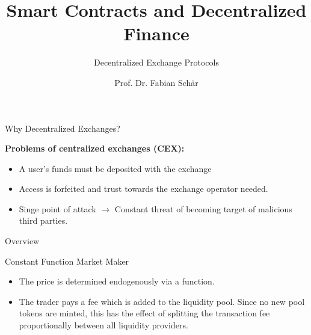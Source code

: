\documentclass[]{beamer}
\title{Smart Contracts and Decentralized Finance}
\subtitle{Decentralized Exchange Protocols}
\author{Prof. Dr. Fabian Schär}
\institute{University of Basel}
\begin{document}
\thispagestyle{empty}
\begin{frame}[noframenumbering]
	\titlepage
\end{frame}


\begin{frame}{Why Decentralized Exchanges?}

	\textbf{Problems of centralized exchanges (CEX):}
		\begin{small}
		\begin{itemize}
			\item A user's funds must be deposited with the exchange
			\item Access is forfeited and trust towards the exchange operator needed.
			\item Singe point of attack $\rightarrow$ Constant threat of becoming target of malicious third parties.
		\end{itemize}
		\end{small}	

\vspace{1.5em}

\end{frame}

\begin{frame}{Overview}
	\begin{figure}[h!]
		
		\caption{\cite{FS:21}}
	\end{figure}
\end{frame}	


\begin{frame}{Constant Function Market Maker}

	\begin{figure}	
		\centering
		
	\end{figure}

	\begin{itemize}
		\item<5-> {The price is determined endogenously via a function.}
		\item<6-> The trader pays a fee which is added to the liquidity pool. Since no new pool tokens are minted, this has the effect of splitting the transaction fee proportionally between all liquidity providers. %
	\end{itemize}


\end{frame}
\end{document}
